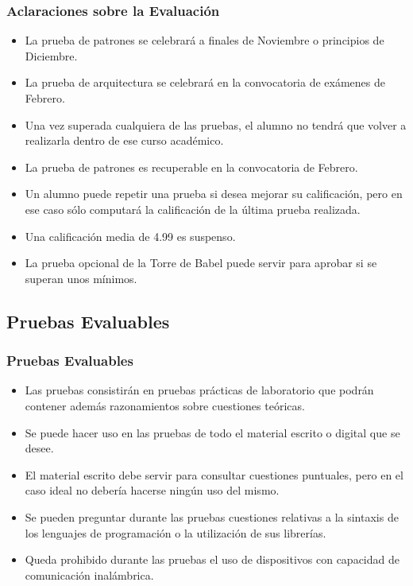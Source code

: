 \documentclass[a4paper,slidestop,xcolor=pst,blue]{beamer}
\begin{document}
\begin{frame}[c]
	\frametitle{Aclaraciones sobre la Evaluación}
	\begin{itemize}
        \item<2-> La prueba de patrones se celebrará a finales de Noviembre o principios de Diciembre.
        \item<3-> La prueba de arquitectura se celebrará en la convocatoria de exámenes de Febrero.
        \item<5-> Una vez superada cualquiera de las pruebas, el alumno no tendrá que volver a realizarla dentro de ese curso académico.
        \item<5-> La prueba de patrones es recuperable en la convocatoria de Febrero.
        \item<6-> Un alumno puede repetir una prueba si desea mejorar su calificación, pero en ese caso sólo computará la calificación de la última prueba realizada.
		\item<7-> Una calificación media de 4.99 es suspenso.
        \item<8-> La prueba opcional de la Torre de Babel puede servir para aprobar si se superan unos mínimos.
	\end{itemize}
\end{frame}

\subsection{Pruebas Evaluables}

\begin{frame}[c]
    \frametitle{Pruebas Evaluables}
	\begin{itemize}[<+->]
	   \item Las pruebas consistirán en pruebas prácticas de laboratorio que podrán contener además razonamientos sobre cuestiones teóricas.
       \item Se puede hacer uso en las pruebas de todo el material escrito o digital que se desee.
       \item El material escrito debe servir para consultar cuestiones puntuales, pero en el caso ideal no debería hacerse ningún uso del mismo.
       \item Se pueden preguntar durante las pruebas cuestiones relativas a la sintaxis de los lenguajes de programación o la utilización de sus librerías.
       \item Queda prohibido durante las pruebas el uso de dispositivos con capacidad de comunicación inalámbrica.
	\end{itemize}
\end{frame}
\end{document}
